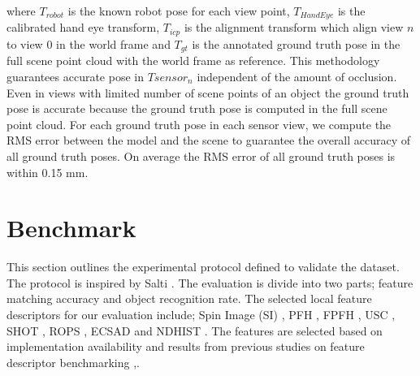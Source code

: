 \documentclass[10pt,twocolumn,letterpaper]{article}
\begin{document}
where $T_{robot}$ is the known robot pose for each view point, $T_{HandEye}$ is the calibrated hand eye transform, $T_{icp}$ is the alignment transform which align view $n$ to view $0$ in the world frame and $T_{gt}$ is the annotated ground truth pose in the full scene point cloud with the world frame as reference. This methodology guarantees accurate pose in $T{sensor_{n}}$ independent of the amount of occlusion. Even in views with limited number of scene points of an object the ground truth pose is accurate because the ground truth pose is computed in the full scene point cloud. For each ground truth pose in each sensor view, we compute the RMS error between the model and the scene to guarantee the overall accuracy of all ground truth poses. On average the RMS error of all ground truth poses is within 0.15 mm.   
\section{Benchmark}\label{sec:benchmark}
This section outlines the experimental protocol defined to validate the dataset. The protocol is inspired by Salti \etal \cite{Salti2014}. The evaluation is divide into two parts; feature matching accuracy and object recognition rate. The selected local feature descriptors for our evaluation include; Spin Image (SI) \cite{Johnson1999}, PFH \cite{Rusu2008}, FPFH \cite{Fpfh2009}, USC \cite{usc2010}, SHOT \cite{Tombari2010}, ROPS \cite{Guo2013}, ECSAD \cite{Ecsad2015} and NDHIST \cite{Buch2016}. The features are selected based on implementation availability and results from previous studies on feature descriptor benchmarking \cite{Guo2015},\cite{Buch2016}. 
\end{document}
